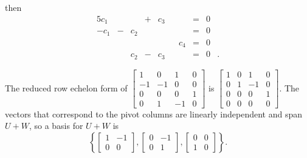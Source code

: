 \begin{example}
then 
\begin{alignat*}{5}
{}c_1 	&{} 		&{}		&{}+{}	&{}c_3	&{}	&{}		&= &0&{} \\
{-}c_1 	&{}-{} 	&{}c_2	&{}		&{}		&{}	&{}		&= &0&{} \\
{} 		&{} 		&{}		&{}		&{}		&{}	&{}c_4	&= &0&{} \\
{}		 	&{} 		&{}c_2	&{}-{}	&{}c_3	&{}	&{}		&= &0&{.} 
\end{alignat*}

The reduced row echelon form of $\left[ \begin{array}{rrrc} 1&0&1&0 \\ -1&-1&0&0 \\ 0&0&0&1 \\ 0&1&-1&0 \end{array} \right]$ is $\left[ \begin{array}{ccrc} 1&0&1&0 \\ 0&1&-1&0 \\ 0&0&0&1 \\ 0&0&0&0 \end{array} \right]$. The vectors that correspond to the pivot columns are linearly independent and span $U+W$, so a basis for $U+W$ is 
\[\left\{ \left[ \begin{array}{cr}   1 &  -1 \\ 0 & 0 \end{array} \right], \left[ \begin{array}{cr}   0 &  -1 \\ 0 & 1 \end{array} \right], \left[ \begin{array}{cc}   0 &  0 \\ 1 & 0 \end{array} \right] \right\}.\]

	\ea


\end{example}



 
\label{sec:bases_summ}

